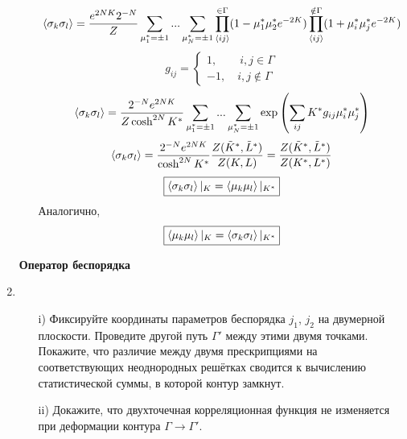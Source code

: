 \documentclass[12pt]{article}
\theoremstyle{definition}
\begin{document}
\begin{enumerate}
\begin{itemize}
\begin{equation}
        \end{equation}
        \begin{equation}
            \braket{\sigma_k\sigma_l}=\frac{e^{2NK}2^{-N}}{Z}\sum\limits_{\mu^*_1=\pm1}...\sum\limits_{\mu^*_N=\pm1}\prod_{\braket{ij}}^{\in\Gamma}(1-\mu^*_1\mu^*_2e^{-2K})\prod_{\braket{ij}}^{\notin\Gamma}(1+\mu^*_i\mu^*_je^{-2K})
        \end{equation}
        \begin{equation}
            g_{ij}=\begin{cases}
                1,\quad\quad i,j\in\Gamma\\
                -1,\quad i,j\notin\Gamma
            \end{cases}
        \end{equation}
        \begin{equation}
            \braket{\sigma_k\sigma_l}=\frac{2^{-N}e^{2NK}}{Z\cosh^{2N}K^*}\sum\limits_{\mu^*_1=\pm1}...\sum\limits_{\mu^*_N=\pm1}\exp\left(\sum\limits_{ij}K^*g_{ij}\mu^*_i\mu^*_j\right)
        \end{equation}
        \begin{equation}
            \braket{\sigma_k\sigma_l}=\frac{2^{-N}e^{2NK}}{\cosh^{2N}K^*}\frac{Z(\tilde K^*,\tilde L^*)}{Z(K,L)}=\frac{Z(\tilde K^*,\tilde L^*)}{Z(K^*,L^*)}
        \end{equation}
        \begin{equation}
            \boxed{\braket{\sigma_k\sigma_l}|_K=\braket{\mu_k\mu_l}|_{K^*}}
        \end{equation}
        Аналогично,
        \begin{equation}
            \boxed{\braket{\mu_k\mu_l}|_K=\braket{\sigma_k\sigma_l}|_{K^*}}
        \end{equation}
    \end{itemize}
    \textbf{Оператор беспорядка}
    \item \begin{itemize}
        \item[i)] Фиксируйте координаты параметров беспорядка $j_1$, $j_2$ на двумерной плоскости. Проведите другой путь $\Gamma'$ между этими двумя точками. Покажите, что различие между двумя прескрипциями на соответствующих неоднородных решётках сводится к вычислению статистической суммы, в которой контур замкнут.
        \item[ii)] Докажите, что двухточечная корреляционная функция не изменяется при деформации контура $\Gamma\rightarrow\Gamma'$.
    \end{itemize}

\end{enumerate}
\end{document}
